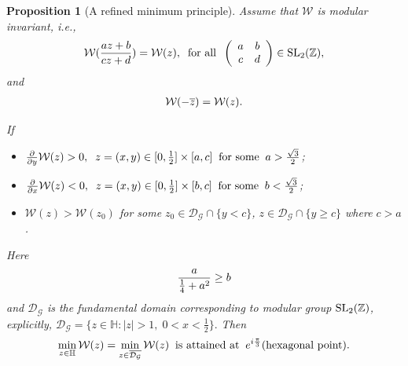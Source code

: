 \documentclass[reqno,english]{amsart}
\newtheorem{proposition}{Proposition}[section]
\newtheorem{open problem}{Open Problem}[section]
\newtheorem{open question}{Open Question}[section]
\newtheorem{open questions on hexagonal lattice}{Open Questions on hexagonal lattice}[section]
\begin{document}
\begin{proposition}[A refined minimum principle]\label{Prop32}  Assume that $\mathcal{W}$ is modular invariant, i.e.,
 \begin{equation}\aligned\nonumber
\mathcal{W}(\frac{az+b}{cz+d})=\mathcal{W}(z),\;\;\hbox{for all}\;\;\left(
                                                                      \begin{array}{cc}
                                                                        a & b \\
                                                                        c & d \\
                                                                      \end{array}
                                                                    \right)\in \hbox{SL}_2(\mathbb{Z}),
\endaligned\end{equation}
and
 \begin{equation}\aligned\nonumber
\mathcal{W}(-\overline{z})=\mathcal{W}(z).
\endaligned\end{equation}

If
\begin{itemize}
  \item [(1)] $\frac{\partial}{\partial y}\mathcal{W}(z)>0,\;\;z=(x,y)\in[0,\frac{1}{2}]\times[a,c]\;\;\hbox{for some}\;\;a>\frac{\sqrt3}{2}$;
  \item [(2)] $\frac{\partial}{\partial x}\mathcal{W}(z)<0,\;\;z=(x,y)\in[0,\frac{1}{2}]\times[b,c]\;\;\hbox{for some}\;\;b<\frac{\sqrt3}{2}$;
  \item [(3)] $\mathcal{W}(z)>\mathcal{W}(z_0)$ for some $z_0\in\mathcal{D}_{\mathcal{G}}\cap\{y< c\}$, \; $z\in\mathcal{D}_{\mathcal{G}}\cap\{y\geq c\}$ where $c>a$.
\end{itemize}
Here
 \begin{equation}\aligned\nonumber
\frac{a}{\frac{1}{4}+a^2}\geq b
\endaligned\end{equation}
and $\mathcal{D}_{\mathcal{G}}$ is the fundamental domain corresponding to modular group $\hbox{SL}_2(\mathbb{Z})$, explicitly, $\mathcal{D}_{\mathcal{G}}=\{
z\in\mathbb{H}: |z|>1,\; 0<x<\frac{1}{2}
\}.$
Then
\begin{equation}\aligned\nonumber
\min_{z\in\mathbb{H}}\mathcal{W}(z)=\min_{z\in\overline{\mathcal{D}_{\mathcal{G}}}}\mathcal{W}(z)\;\;\hbox{is attained at}\;\; e^{i\frac{\pi}{3}}(\hbox{hexagonal point}).
\endaligned\end{equation}

\end{proposition}
\end{document}
